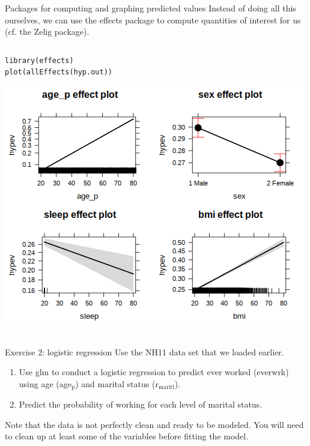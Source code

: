 \documentclass[table,smaller]{beamer}
\begin{document}
\begin{frame}[fragile,label=sec-4-5]{Packages for  computing and graphing predicted values}
 Instead of doing all this ourselves, we can use the effects package to compute quantities of interest for us (cf. the Zelig package).

\begin{columns}  \begin{block}{}
\begin{verbatim}
library(effects)
plot(allEffects(hyp.out))
\end{verbatim}

\includegraphics[width=.9\linewidth]{images/effects1.png}
\end{block} \end{columns}
\end{frame}



\begin{frame}[label=sec-4-6]{Exercise 2: logistic regression}
Use the NH11 data set that we loaded earlier.

\begin{enumerate}
\item Use glm  to conduct a logistic regression to predict ever worked (everwrk) using age (age$_{\text{p}}$) and marital status (r$_{\text{maritl}}$).
\item Predict the probability of working for each level of marital status.
\end{enumerate}

Note that the data is not perfectly clean and ready to be modeled. You will need to clean up at least some of the variables before fitting the model.
\end{frame}
\end{document}
